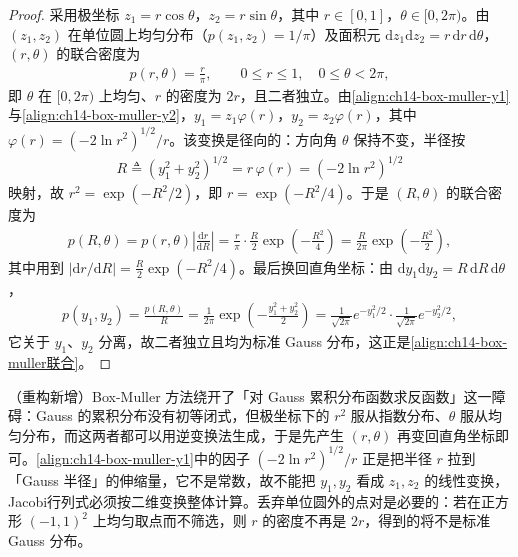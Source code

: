 \documentclass[../../main.tex]{subfiles}
\begin{document}
\begin{proof}
采用极坐标 $z_{1}=r\cos\theta$，$z_{2}=r\sin\theta$，其中 $r\in[0,1]$，$\theta\in[0,2\pi)$。由 $(z_{1},z_{2})$ 在单位圆上均匀分布（$p(z_{1},z_{2})=1/\pi$）及面积元 $\mathrm{d}z_{1}\mathrm{d}z_{2}=r\,\mathrm{d}r\,\mathrm{d}\theta$，$(r,\theta)$ 的联合密度为
\begin{align*}
p(r,\theta)=\frac{r}{\pi},\qquad 0\leqslant r\leqslant 1,\quad 0\leqslant\theta<2\pi,
\end{align*}
即 $\theta$ 在 $[0,2\pi)$ 上均匀、$r$ 的密度为 $2r$，且二者独立。由\eqref{align:ch14-box-muller-y1}与\eqref{align:ch14-box-muller-y2}，$y_{1}=z_{1}\varphi(r)$，$y_{2}=z_{2}\varphi(r)$，其中 $\varphi(r)=\left(-2\ln r^{2}\right)^{1/2}/r$。该变换是径向的：方向角 $\theta$ 保持不变，半径按
\begin{align*}
R\triangleq\left(y_{1}^{2}+y_{2}^{2}\right)^{1/2}=r\,\varphi(r)=\left(-2\ln r^{2}\right)^{1/2}
\end{align*}
映射，故 $r^{2}=\exp\left(-R^{2}/2\right)$，即 $r=\exp\left(-R^{2}/4\right)$。于是 $(R,\theta)$ 的联合密度为
\begin{align*}
p(R,\theta)=p(r,\theta)\left|\frac{\mathrm{d}r}{\mathrm{d}R}\right|=\frac{r}{\pi}\cdot\frac{R}{2}\exp\left(-\frac{R^{2}}{4}\right)=\frac{R}{2\pi}\exp\left(-\frac{R^{2}}{2}\right),
\end{align*}
其中用到 $\left|\mathrm{d}r/\mathrm{d}R\right|=\frac{R}{2}\exp\left(-R^{2}/4\right)$。最后换回直角坐标：由 $\mathrm{d}y_{1}\mathrm{d}y_{2}=R\,\mathrm{d}R\,\mathrm{d}\theta$，
\begin{align*}
p(y_{1},y_{2})=\frac{p(R,\theta)}{R}=\frac{1}{2\pi}\exp\left(-\frac{y_{1}^{2}+y_{2}^{2}}{2}\right)=\frac{1}{\sqrt{2\pi}}e^{-y_{1}^{2}/2}\cdot\frac{1}{\sqrt{2\pi}}e^{-y_{2}^{2}/2},
\end{align*}
它关于 $y_{1}$、$y_{2}$ 分离，故二者独立且均为标准 Gauss 分布，这正是\eqref{align:ch14-box-muller联合}。
\end{proof}

\begin{remark}（重构新增）Box-Muller 方法绕开了「对 Gauss 累积分布函数求反函数」这一障碍：Gauss 的累积分布没有初等闭式，但极坐标下的 $r^{2}$ 服从指数分布、$\theta$ 服从均匀分布，而这两者都可以用逆变换法生成，于是先产生 $(r,\theta)$ 再变回直角坐标即可。\eqref{align:ch14-box-muller-y1}中的因子 $\left(-2\ln r^{2}\right)^{1/2}/r$ 正是把半径 $r$ 拉到「Gauss 半径」的伸缩量，它不是常数，故不能把 $y_{1},y_{2}$ 看成 $z_{1},z_{2}$ 的线性变换，Jacobi行列式必须按二维变换整体计算。丢弃单位圆外的点对是必要的：若在正方形 $(-1,1)^{2}$ 上均匀取点而不筛选，则 $r$ 的密度不再是 $2r$，得到的将不是标准 Gauss 分布。
\end{remark}
\end{document}
